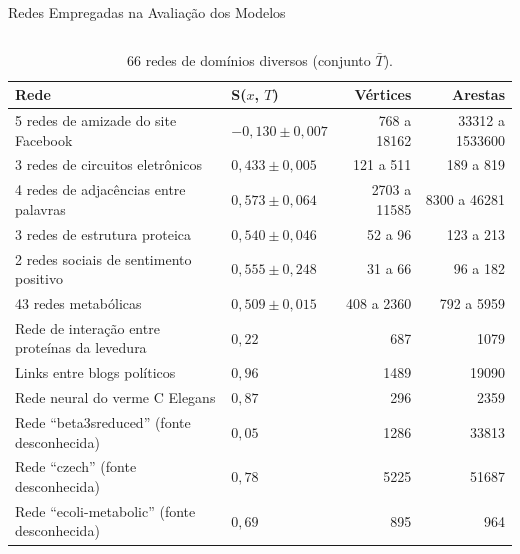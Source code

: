 \begin{chapter}{Redes Empregadas na Avaliação dos Modelos}
\begin{center}
\begin{longtable}{| p{10cm} | c | r | r |}
\end{longtable}
\end{center}


\begin{center}
\begin{longtable}{| p{6cm} | l | r | r | }
	\caption{66 redes de domínios diversos (conjunto $\bar{T}$).} \\
	\hline
	\textbf{Rede} & \textbf{S($x$, $T$)} & \textbf{Vértices} & \textbf{Arestas} \\ \hline
	\hline
	5 redes de amizade do site Facebook \cite{Traud2008} & $-0,130 \pm 0,007$ & 768 a 18162 & 33312 a 1533600 \\ \hline
	3 redes de circuitos eletrônicos \cite{Milo2004} & $0,433 \pm 0,005$ & 121 a 511 & 189 a 819 \\ \hline
	4 redes de adjacências entre palavras \cite{Milo2004} & $0,573 \pm 0,064$ & 2703 a 11585 & 8300 a 46281 \\ \hline
	3 redes de estrutura proteica \cite{Milo2004} & $0,540 \pm 0,046$ & 52 a 96 & 123 a 213 \\ \hline
	2 redes sociais de sentimento positivo \cite{Milo2004} & $0,555 \pm 0,248$ & 31 a 66 & 96 a 182 \\ \hline
	43 redes metabólicas \cite{Jeong2000} & $0,509 \pm 0,015$ & 408 a 2360 & 792 a 5959 \\ \hline
	Rede de interação entre proteínas da levedura \cite{Jeong2001} & $0,22$ & 687 & 1079 \\ \hline
	Links entre blogs políticos \cite{Adamic2005} & $0,96$ & 1489 & 19090 \\ \hline
	Rede neural do verme C Elegans \cite{Watts1998} & $0,87$ & 296 & 2359 \\ \hline
	Rede ``beta3sreduced'' (fonte desconhecida) & $0,05$ & 1286 & 33813 \\ \hline
	Rede ``czech'' (fonte desconhecida) & $0,78$ & 5225 & 51687 \\  \hline
	Rede ``ecoli-metabolic'' (fonte desconhecida) & $0,69$ & 895 & 964 \\ \hline
	
\end{longtable}
\end{center}

\end{chapter}

